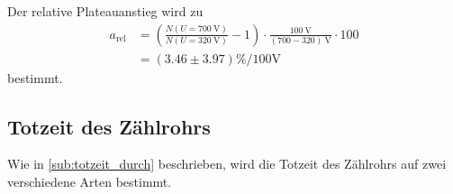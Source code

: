 Der relative Plateauanstieg wird zu
\begin{align*}
    a_\text{rel} &= \left( \frac{N(U=\SI{700}{\volt})}{N(U=\SI{320}{\volt})} - 1 \right) \cdot \frac{\SI{100}{\volt}}{(700-320)\:\si{\volt}} \cdot 100 \\
             &= (3.46 \pm 3.97)\si{\percent\per100\volt}
\end{align*}
bestimmt.

\subsection{Totzeit des Zählrohrs}
\label{sub:totzeit_aus}

Wie in \autoref{sub:totzeit_durch} beschrieben, wird die Totzeit des Zählrohrs auf zwei verschiedene Arten bestimmt.







